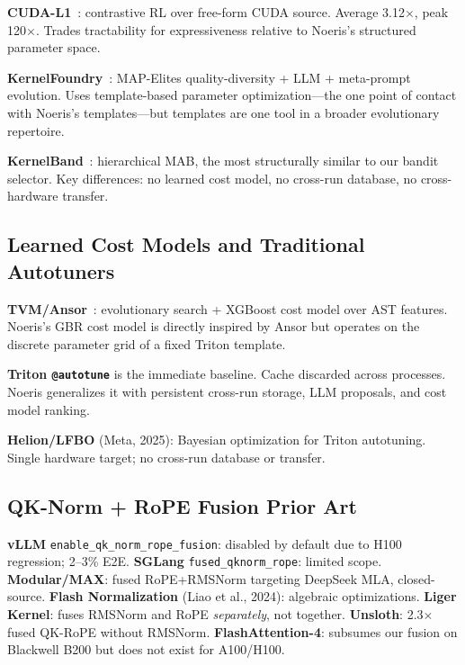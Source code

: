 \documentclass[11pt]{article}
\begin{document}
\textbf{CUDA-L1}~\citep{cudal1}: contrastive RL over free-form CUDA source.
Average 3.12$\times$, peak 120$\times$. Trades tractability for expressiveness
relative to Noeris's structured parameter space.

\textbf{KernelFoundry}~\citep{kernelfoundry}: MAP-Elites quality-diversity +
LLM + meta-prompt evolution. Uses template-based parameter optimization---the
one point of contact with Noeris's templates---but templates are one tool in a
broader evolutionary repertoire.

\textbf{KernelBand}~\citep{kernelband}: hierarchical MAB, the most structurally
similar to our bandit selector. Key differences: no learned cost model, no
cross-run database, no cross-hardware transfer.


\subsection{Learned Cost Models and Traditional Autotuners}
\label{sec:rw-cost-models}

\textbf{TVM/Ansor}~\citep{ansor}: evolutionary search + XGBoost cost model over
AST features. Noeris's GBR cost model is directly inspired by Ansor but operates
on the discrete parameter grid of a fixed Triton template.

\textbf{Triton \texttt{@autotune}} is the immediate baseline. Cache discarded
across processes. Noeris generalizes it with persistent cross-run storage, LLM
proposals, and cost model ranking.

\textbf{Helion/LFBO} (Meta, 2025): Bayesian optimization for Triton autotuning.
Single hardware target; no cross-run database or transfer.


\subsection{QK-Norm + RoPE Fusion Prior Art}
\label{sec:rw-fusion}

\textbf{vLLM} \texttt{enable\_qk\_norm\_rope\_fusion}: disabled by default due to
H100 regression; 2--3\% E2E. \textbf{SGLang} \texttt{fused\_qknorm\_rope}:
limited scope. \textbf{Modular/MAX}: fused RoPE+RMSNorm targeting DeepSeek MLA,
closed-source. \textbf{Flash Normalization} (Liao et al., 2024): algebraic
optimizations. \textbf{Liger Kernel}: fuses RMSNorm and RoPE \emph{separately},
not together. \textbf{Unsloth}: 2.3$\times$ fused QK-RoPE without RMSNorm.
\textbf{FlashAttention-4}: subsumes our fusion on Blackwell B200 but does not
exist for A100/H100.
\end{document}
